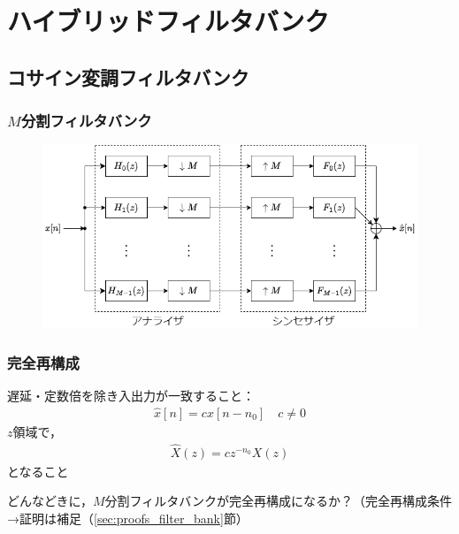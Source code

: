 \documentclass[14pt,xcolor=dvipsnames,table,dvipdfmx]{beamer}
\begin{document}
\section{ハイブリッドフィルタバンク}

\subsection{コサイン変調フィルタバンク}

\begin{frame}[c]
    \frametitle{$M$分割フィルタバンク}
    \begin{figure}
        \includegraphics[width=120mm]{./figs/filter_bank.drawio.png}
    \end{figure}
\end{frame}

\begin{frame}[c]
    \frametitle{完全再構成}
    遅延・定数倍を除き入出力が一致すること：
    \begin{align}
        \hat{x}[n] = c x[n - n_{0}] \quad c \neq 0
    \end{align}
    $z$領域で，
    \begin{align}
        \hat{X}(z) = c z^{-n_{0}} X(z)
    \end{align}
    となること
    \begin{block}{}
        どんなどきに，$M$分割フィルタバンクが完全再構成になるか？（完全再構成条件→証明は補足（\ref{sec:proofs_filter_bank}節）
    \end{block}
\end{frame}
\end{document}
